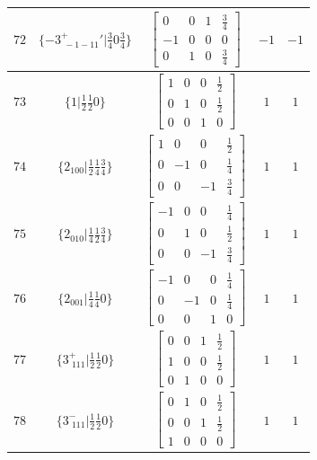 \documentclass[fleqn,8pt]{jsarticle}
\begin{document}
\begin{longtable}{ccccc}
$ 72 $ & $ \{-3^{+}_{\,\,-1-11}{}'|\frac{3}{4} 0 \frac{3}{4}\} $ & $ \begin{bmatrix} 0 & 0 & 1 & \frac{3}{4} \\ -1 & 0 & 0 & 0 \\ 0 & 1 & 0 & \frac{3}{4} \end{bmatrix} $ & $ -1 $ & $ -1 $ \\ \hline
$ 73 $ & $ \{1|\frac{1}{2} \frac{1}{2} 0\} $ & $ \begin{bmatrix} 1 & 0 & 0 & \frac{1}{2} \\ 0 & 1 & 0 & \frac{1}{2} \\ 0 & 0 & 1 & 0 \end{bmatrix} $ & $ 1 $ & $ 1 $ \\ \hline
$ 74 $ & $ \{2{}_{100}|\frac{1}{2} \frac{1}{4} \frac{3}{4}\} $ & $ \begin{bmatrix} 1 & 0 & 0 & \frac{1}{2} \\ 0 & -1 & 0 & \frac{1}{4} \\ 0 & 0 & -1 & \frac{3}{4} \end{bmatrix} $ & $ 1 $ & $ 1 $ \\ \hline
$ 75 $ & $ \{2{}_{010}|\frac{1}{4} \frac{1}{2} \frac{3}{4}\} $ & $ \begin{bmatrix} -1 & 0 & 0 & \frac{1}{4} \\ 0 & 1 & 0 & \frac{1}{2} \\ 0 & 0 & -1 & \frac{3}{4} \end{bmatrix} $ & $ 1 $ & $ 1 $ \\ \hline
$ 76 $ & $ \{2{}_{001}|\frac{1}{4} \frac{1}{4} 0\} $ & $ \begin{bmatrix} -1 & 0 & 0 & \frac{1}{4} \\ 0 & -1 & 0 & \frac{1}{4} \\ 0 & 0 & 1 & 0 \end{bmatrix} $ & $ 1 $ & $ 1 $ \\ \hline
$ 77 $ & $ \{3^{+}_{\,\,111}|\frac{1}{2} \frac{1}{2} 0\} $ & $ \begin{bmatrix} 0 & 0 & 1 & \frac{1}{2} \\ 1 & 0 & 0 & \frac{1}{2} \\ 0 & 1 & 0 & 0 \end{bmatrix} $ & $ 1 $ & $ 1 $ \\ \hline
$ 78 $ & $ \{3^{-}_{\,\,111}|\frac{1}{2} \frac{1}{2} 0\} $ & $ \begin{bmatrix} 0 & 1 & 0 & \frac{1}{2} \\ 0 & 0 & 1 & \frac{1}{2} \\ 1 & 0 & 0 & 0 \end{bmatrix} $ & $ 1 $ & $ 1 $ \\ \hline

\end{longtable}
\end{document}
